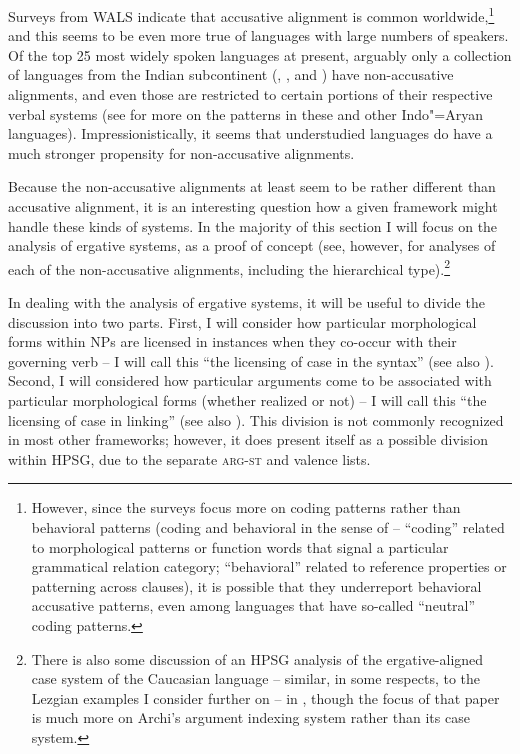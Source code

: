 \documentclass[output=paper
	        ,collection
	        ,collectionchapter
 	        ,biblatex
                ,babelshorthands
                ,newtxmath
                ,draftmode
                ,colorlinks, citecolor=brown
]{langscibook}
\begin{document}
Surveys from WALS \citep{comrieWALSalignfullNP,comrieWALSalignpro,siewierskaWALSalignvp} indicate that accusative alignment is common worldwide,\footnote{However, since the surveys focus more on coding patterns  rather than behavioral patterns  (coding and behavioral in the sense of \citealt{keenan76subjects} -- ``coding'' related to morphological patterns or function words that signal a particular grammatical relation category; ``behavioral'' related to reference properties or patterning across clauses), it is possible that they underreport behavioral accusative patterns, even among languages that have so-called ``neutral'' coding patterns.} and this seems to be even more true of languages with large numbers of speakers. Of the top 25 most widely spoken languages at present, arguably only a collection of languages from the Indian subcontinent (, , and ) have non-accusative alignments, and even those are restricted to certain portions of their respective verbal systems (see \citealt[Chapter 7]{verbeke13} for more on the patterns in these and other Indo"=Aryan languages). Impressionistically, it seems that understudied languages do have a much stronger propensity for non-accusative alignments. 

Because the non-accusative alignments at least seem to be rather different than accusative alignment, it is an interesting question how a given framework might handle these kinds of systems. In the majority of this section I will focus on the analysis of ergative systems, as a proof of concept (see, however, \citealt{Drellishak2009a-u} for analyses of each of the non-accusative alignments, including the hierarchical type).\footnote{There is also some discussion of an HPSG analysis of the ergative-aligned case system of the Caucasian language  -- similar, in some respects, to the Lezgian examples I consider further on -- in \citet{borsley16}, though the focus of that paper is much more on Archi's argument indexing system rather than its case system.}

In dealing with the analysis of ergative systems, it will be useful to divide the discussion into two parts. First, I will consider how particular morphological forms within NPs are licensed in instances when they co-occur with their governing verb -- I will call this ``the licensing of case in the syntax'' (see also ). Second, I will considered how particular arguments come to be associated with particular morphological forms (whether realized or not) -- I will call this ``the licensing of case in linking''  (see also ). This division is not commonly recognized in most other frameworks; however, it does present itself as a possible division within HPSG, due to the separate \textsc{arg-st} and valence lists. 
\end{document}
